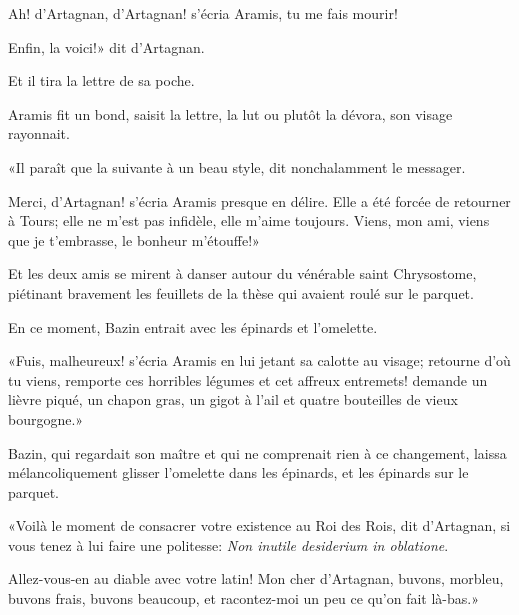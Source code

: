 \speak  Ah! d'Artagnan, d'Artagnan! s'écria Aramis, tu me fais mourir! 

\speak  Enfin, la voici!» dit d'Artagnan. 

Et il tira la lettre de sa poche. 

Aramis fit un bond, saisit la lettre, la lut ou plutôt la dévora, son visage rayonnait. 

«Il paraît que la suivante à un beau style, dit nonchalamment le messager. 

\speak  Merci, d'Artagnan! s'écria Aramis presque en délire. Elle a été forcée de retourner à Tours; elle ne m'est pas infidèle, elle m'aime toujours. Viens, mon ami, viens que je t'embrasse, le bonheur m'étouffe!» 

Et les deux amis se mirent à danser autour du vénérable saint Chrysostome, piétinant bravement les feuillets de la thèse qui avaient roulé sur le parquet. 

En ce moment, Bazin entrait avec les épinards et l'omelette. 

«Fuis, malheureux! s'écria Aramis en lui jetant sa calotte au visage; retourne d'où tu viens, remporte ces horribles légumes et cet affreux entremets! demande un lièvre piqué, un chapon gras, un gigot à l'ail et quatre bouteilles de vieux bourgogne.» 

Bazin, qui regardait son maître et qui ne comprenait rien à ce changement, laissa mélancoliquement glisser l'omelette dans les épinards, et les épinards sur le parquet. 

«Voilà le moment de consacrer votre existence au Roi des Rois, dit d'Artagnan, si vous tenez à lui faire une politesse: \textit{Non inutile desiderium in oblatione}. 

\speak  Allez-vous-en au diable avec votre latin! Mon cher d'Artagnan, buvons, morbleu, buvons frais, buvons beaucoup, et racontez-moi un peu ce qu'on fait là-bas.»